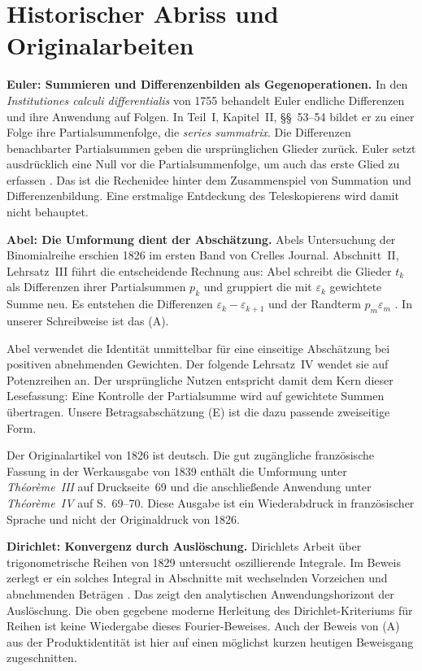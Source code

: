 \section{Historischer Abriss und Originalarbeiten}

\textbf{Euler: Summieren und Differenzenbilden als Gegenoperationen.}
In den \emph{Institutiones calculi differentialis} von 1755 behandelt
Euler endliche Differenzen und ihre Anwendung auf Folgen. In Teil~I,
Kapitel~II, \S\S~53--54 bildet er zu einer Folge ihre Partialsummenfolge,
die \emph{series summatrix}. Die Differenzen benachbarter Partialsummen
geben die ursprünglichen Glieder zurück. Euler setzt ausdrücklich eine
Null vor die Partialsummenfolge, um auch das erste Glied zu erfassen
\cite{abel:euler}. Das ist die Rechenidee hinter dem Zusammenspiel
von Summation und Differenzenbildung. Eine erstmalige Entdeckung des
Teleskopierens wird damit nicht behauptet.

\textbf{Abel: Die Umformung dient der Abschätzung.}
Abels Untersuchung der Binomialreihe erschien 1826 im ersten Band
von Crelles Journal. Abschnitt~II, Lehrsatz~III führt die entscheidende
Rechnung aus: Abel schreibt die Glieder $t_k$ als Differenzen ihrer
Partialsummen $p_k$ und gruppiert die mit $\varepsilon_k$ gewichtete
Summe neu. Es entstehen die Differenzen
$\varepsilon_k-\varepsilon_{k+1}$ und der Randterm
$p_m\varepsilon_m$ \cite{abel:original}. In unserer Schreibweise
ist das (A).

Abel verwendet die Identität unmittelbar für eine einseitige
Abschätzung bei positiven abnehmenden Gewichten. Der folgende
Lehrsatz~IV wendet sie auf Potenzreihen an. Der ursprüngliche Nutzen
entspricht damit dem Kern dieser Lesefassung: Eine Kontrolle der
Partialsumme wird auf gewichtete Summen übertragen. Unsere
Betragsabschätzung (E) ist die dazu passende zweiseitige Form.

Der Originalartikel von 1826 ist deutsch. Die gut zugängliche
französische Fassung in der Werkausgabe von 1839 enthält die
Umformung unter \emph{Théorème~III} auf Druckseite~69 und die
anschließende Anwendung unter \emph{Théorème~IV} auf S.~69--70.
Diese Ausgabe ist ein Wiederabdruck in französischer Sprache und
nicht der Originaldruck von 1826.

\textbf{Dirichlet: Konvergenz durch Auslöschung.}
Dirichlets Arbeit über trigonometrische Reihen von 1829 untersucht
oszillierende Integrale. Im Beweis zerlegt er ein solches Integral
in Abschnitte mit wechselnden Vorzeichen und abnehmenden Beträgen
\cite{abel:dirichlet}. Das zeigt den analytischen Anwendungshorizont
der Auslöschung. Die oben gegebene moderne Herleitung des
Dirichlet-Kriteriums für Reihen ist keine Wiedergabe dieses
Fourier-Beweises. Auch der Beweis von (A) aus der Produktidentität
ist hier auf einen möglichst kurzen heutigen Beweisgang zugeschnitten.


